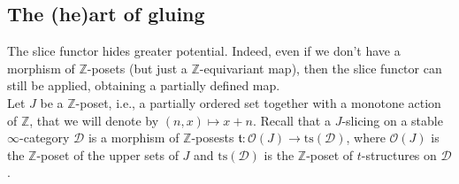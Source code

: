 \documentclass{article}
\theoremstyle{definition}
\newcommand{\Z}{\mathbb{Z}}
\newcommand{\Oo}{\mathcal{O}}
\newcommand{\ts}{\mathrm{ts}}
\newcommand{\tee}{\mathfrak{t}}
\begin{document}
\begin{titlepage}
\end{titlepage}




\subsection{The (he)art of gluing} The slice functor hides greater potential. Indeed, even if we don't have a morphism of $\mathbb{Z}$-posets (but just a $\mathbb{Z}$-equivariant map), then the slice functor can still be applied, obtaining a partially defined map. \\

Let $J$ be a $\Z$-poset, i.e., a partially ordered set together with a monotone action of $\Z$, that we will denote by $(n,x)\mapsto x+n$. Recall that a $J$-slicing on a stable $\infty$-category $\mathscr{D}$ is a morphism of $\Z$-posests $\tee\colon \Oo(J)\to \ts(\mathscr{D})$, where $\Oo(J)$ is the $\Z$-poset of the upper sets of $J$ and $\ts(\mathscr{D})$ is the $\Z$-poset of $t$-structures on $\mathscr{D}$.
\end{document}
